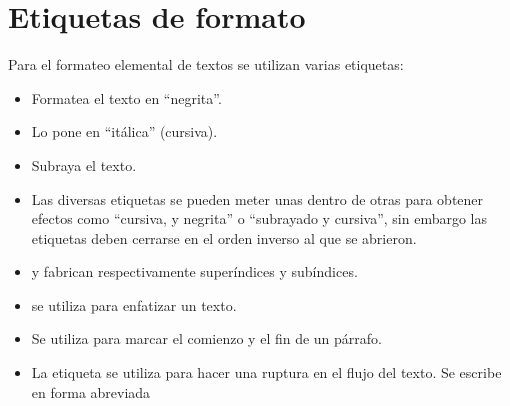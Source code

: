 \documentclass[letterpaper,10pt,spanish]{sphinxmanual}
\begin{document}
\section{Etiquetas de formato}
\label{\detokenize{tema2:etiquetas-de-formato}}
Para el formateo elemental de textos se utilizan varias etiquetas:
\begin{itemize}
\item {} 
 Formatea el texto en “negrita”.

\item {} 
 Lo pone en “itálica” (cursiva).

\item {} 
 Subraya el texto.

\item {} 
Las diversas etiquetas se pueden meter unas dentro de otras para obtener efectos como “cursiva, y negrita” o “subrayado y cursiva”, sin embargo las etiquetas deben cerrarse en el orden inverso al que se abrieron.

\item {} 
 y  fabrican respectivamente superíndices y subíndices.

\item {} 
 se utiliza para enfatizar un texto.

\item {} 
 Se utiliza para marcar el comienzo y el fin de un párrafo.

\item {} 
La etiqueta  se utiliza para hacer una ruptura en el flujo del texto. Se escribe en forma abreviada 

\end{itemize}
\end{document}
